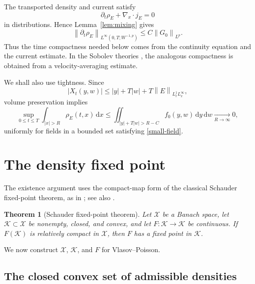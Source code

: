 \documentclass[11pt]{article}
\newtheorem{theorem}{Theorem}
\newcommand{\norm}[1]{\left\lVert #1\right\rVert}
\newcommand{\abs}[1]{\left\lvert #1\right\rvert}
\newcommand{\dd}{\,\mathrm d}
\begin{document}
The transported density and current satisfy
\begin{equation}\label{continuity-equation}
 \partial_t\rho_E+\nabla_x\cdot j_E=0
\end{equation}
in distributions.  Hence Lemma~\ref{lem:mixing} gives
 \begin{equation}\label{time-derivative-density}
 \norm{\partial_t\rho_E}_{L^\infty(0,T;W^{-1,p})}
 \leq C\norm{G_0}_{L^p}.
\end{equation} 
Thus the time compactness needed below comes from the continuity equation and
the current estimate.  In the Sobolev theories \cite{JT,Tae}, the analogous
compactness is obtained from a velocity-averaging estimate.

We shall also use tightness.  Since
\begin{equation*}
 \abs{X_t(y,w)}
 \leq\abs y+T\abs w+T\norm E_{L^1_tL^\infty_x},
\end{equation*}
volume preservation implies
\begin{equation}\label{tail-estimate}
 \sup_{0\leq t\leq T}\int_{\abs x>R}\rho_E(t,x)\dd x
 \leq
 \iint_{\abs y+T\abs w>R-C}f_0(y,w)\dd y\dd w
 \xrightarrow[R\to\infty]{}0,
\end{equation}
uniformly for fields in a bounded set satisfying
\eqref{small-field}.

\section{The density fixed point}\label{sec:fixed-point}

The existence argument uses the compact-map form of the
classical Schauder fixed-point theorem, as in
\cite[Section~4.1]{NguyenMemoir}; see also
\cite[Section~11.1]{GilbargTrudinger}.

\begin{theorem}[Schauder fixed-point theorem]\label{thm:Schauder}
Let $\mathcal X$ be a Banach space, let
$\mathcal K\subset\mathcal X$ be nonempty, closed, and convex, and let
$F:\mathcal K\to\mathcal K$ be continuous.  If $F(\mathcal K)$ is relatively
compact in $\mathcal X$, then $F$ has a fixed point in $\mathcal K$.
\end{theorem}

We now construct $\mathcal X$, $\mathcal K$, and $F$ for
Vlasov--Poisson.

\subsection{The closed convex set of admissible
densities}
\end{document}
